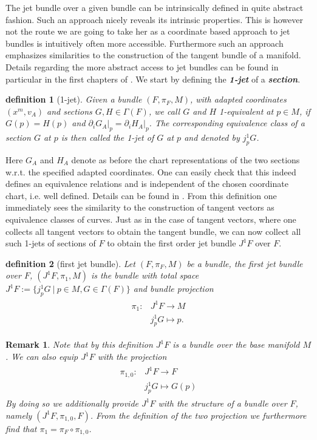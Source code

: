 \documentclass[a4paper,12pt, DIV=14, BCOR=5mm, twoside, headsepline]{scrbook}
\newtheorem{definition}{definition}[section]
\newtheorem*{remark}{Remark}
\begin{document}
The jet bundle over a given bundle can be intrinsically defined in quite abstract fashion. Such an approach nicely reveals its intrinsic properties. This is however not the route we are going to take her as a coordinate based approach to jet bundles is intuitively often more accessible. Furthermore such an approach emphasizes similarities to the construction of the tangent bundle of a manifold. Details regarding the more abstract access to jet bundles can be found in particular in the first chapters of \cite{seiler2009involution}. 
We start by defining the \textbf{\textit{1-jet}} of a \textbf{\textit{section}}.
\begin{definition}[1-jet] 
Given a bundle $(F, \pi_F, M)$, with adapted coordinates $(x^m, v_A)$ and sections $G,H \in \Gamma(F)$, we call $G$ and $H$ 1-equivalent at $p \in M$, if $G(p) = H(p)$ and $\partial_i G_A \vert_p = \partial_i H_A \vert_p$. The corresponding equivalence class of a section $G$ at $p$ is then called the 1-jet of $G$ at $p$ and denoted by $j^1_pG$.
\end{definition}
Here $G_A$ and $H_A$ denote as before the chart representations of the two sections w.r.t. the specified adapted coordinates. One can easily check that this indeed defines an equivalence relations and is independent of the chosen coordinate chart, i.e. well defined. Details can be found in \cite{saunders_1989}. From this definition one immediately sees the similarity to the construction of tangent vectors as equivalence classes of curves. Just as in the case of tangent vectors, where one collects all tangent vectors to obtain the tangent bundle, we can now collect all such 1-jets of sections of $F$ to obtain the first order jet bundle $J^1F$ over $F$. 
\begin{definition}[first jet bundle]
Let $(F, \pi_F, M)$ be a bundle, the first jet bundle over $F$, $(J^1F,\pi_1,M)$ is the bundle with total space $J^1F := \{j^1_pG \ \vert \  p \in M, G \in \Gamma(F)\}$ and bundle projection 
\begin{align}
    \begin{aligned}
\pi_1 : &J^1F \longrightarrow M \\
&j^1_pG \longmapsto p.
    \end{aligned}
\end{align}
\end{definition}
\begin{remark}
Note that by this definition $J^1F$ is a bundle over the base manifold $M$. We can also equip $J^1F$ with the projection 
\begin{align}
    \begin{aligned}
    \pi_{1,0} : &J^1F \longrightarrow F \\
    &j^1_pG \longmapsto G(p)
    \end{aligned}
\end{align}
By doing so we additionally provide $J^1F$ with the structure of a bundle over $F$, namely $(J^1F,\pi_{1,0},F)$. From the definition of the two projection we furthermore find that $\pi_1 = \pi_F \circ \pi_{1,0}$. 
\end{remark}
\end{document}

